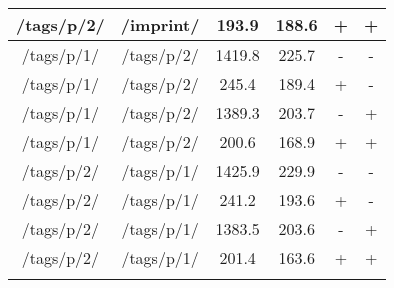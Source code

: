 \begin{appendix}
\begin{center}
\begin{longtable}{cccccc}
/tags/p/2/ & /imprint/ & 193.9 & 188.6 & + & + \\
\hline
\hline
/tags/p/1/ & /tags/p/2/ & 1419.8 & 225.7 & - & - \\
/tags/p/1/ & /tags/p/2/ & 245.4 & 189.4 & + & - \\
/tags/p/1/ & /tags/p/2/ & 1389.3 & 203.7 & - & + \\
/tags/p/1/ & /tags/p/2/ & 200.6 & 168.9 & + & + \\
\hline
/tags/p/2/ & /tags/p/1/ & 1425.9 & 229.9 & - & - \\
/tags/p/2/ & /tags/p/1/ & 241.2 & 193.6 & + & - \\
/tags/p/2/ & /tags/p/1/ & 1383.5 & 203.6 & - & + \\
/tags/p/2/ & /tags/p/1/ & 201.4 & 163.6 & + & + \\
\hline
\label{tab:curl_results_external}
\end{longtable}
\end{center}

\newpage{}


\end{appendix}

